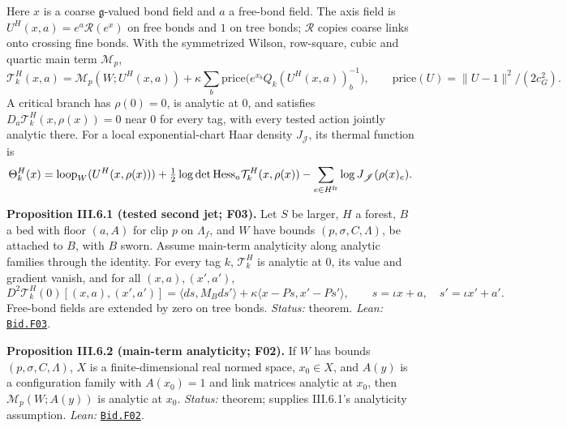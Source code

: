 \documentclass[
  letterpaper,
  11pt]{article}
\begin{document}
Here \(x\) is a coarse \(\mathfrak g\)-valued bond field and \(a\) a
free-bond field. The axis field is \(U^H(x,a)=e^a\mathcal R(e^x)\) on
free bonds and \(1\) on tree bonds; \(\mathcal R\) copies coarse links
onto crossing fine bonds. With the symmetrized Wilson, row-square, cubic
and quartic main term \(\mathcal M_p\),
\[\mathcal T^H_k(x,a)=\mathcal M_p(W;U^H(x,a))+\kappa\sum_b\mathrm{price}\big(e^{x_b}Q_k(U^H(x,a))_b^{-1}\big),\qquad\mathrm{price}(U)=\|U-1\|^2/(2c_G^2).\]
A critical branch has \(\rho(0)=0\), is analytic at \(0\), and satisfies
\(D_a\mathcal T^H_k(x,\rho(x))=0\) near \(0\) for every tag, with every
tested action jointly analytic there. For a local exponential-chart Haar
density \(J_{\mathscr J}\), its thermal function is
\[\Theta^H_k(x)=\mathrm{loop}_W(U^H(x,\rho(x)))+\tfrac12\log\det\mathrm{Hess}_a\mathcal T^H_k(x,\rho(x))-\sum_{e\in H^{\rm fr}}\log J_{\mathscr J}(\rho(x)_e).\]

\textbf{Proposition III.6.1 (tested second jet; F03).} Let \(S\) be
larger, \(H\) a forest, \(B\) a bed with floor \((a,A)\) for clip \(p\)
on \(\Lambda_f\), and \(W\) have bounds \((p,\sigma,C,\Lambda)\), be
attached to \(B\), with \(B\) sworn. Assume main-term analyticity along
analytic families through the identity. For every tag \(k\),
\(\mathcal T^H_k\) is analytic at \(0\), its value and gradient vanish,
and for all \((x,a),(x',a')\),
\[D^2\mathcal T^H_k(0)[(x,a),(x',a')]=\langle ds,M_Bds'\rangle+\kappa\langle x-Ps,x'-Ps'\rangle,\qquad s=\iota x+a,\quad s'=\iota x'+a'.\]
Free-bond fields are extended by zero on tree bonds. \emph{Status:}
theorem. \emph{Lean:}
\href{https://github.com/yang-mills-group/OpenAI-YM-20261028/blob/3456e5e75cf8d4cd558955a5c7638fba2d68f464/YM/Bid/Station.lean\#L78-L81}{\texttt{Bid.F03}}.

\textbf{Proposition III.6.2 (main-term analyticity; F02).} If \(W\) has
bounds \((p,\sigma,C,\Lambda)\), \(X\) is a finite-dimensional real
normed space, \(x_0\in X\), and \(A(y)\) is a configuration family with
\(A(x_0)=1\) and link matrices analytic at \(x_0\), then
\(\mathcal M_p(W;A(y))\) is analytic at \(x_0\). \emph{Status:} theorem;
supplies III.6.1's analyticity assumption. \emph{Lean:}
\href{https://github.com/yang-mills-group/OpenAI-YM-20261028/blob/3456e5e75cf8d4cd558955a5c7638fba2d68f464/YM/Bid/Station.lean\#L73}{\texttt{Bid.F02}}.
\end{document}

